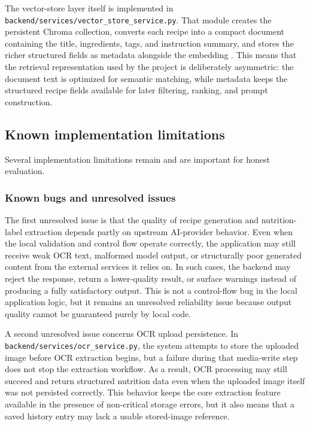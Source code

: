 The vector-store layer itself is implemented in
\texttt{backend/services/vector\_store\_service.py}. That module creates
the persistent Chroma collection, converts each recipe into a compact
document containing the title, ingredients, tags, and instruction
summary, and stores the richer structured fields as metadata alongside
the embedding \cite{chromadb2026docs}. This means that the retrieval
representation used by the project is deliberately asymmetric: the
document text is optimized for semantic matching, while metadata keeps
the structured recipe fields available for later filtering, ranking, and
prompt construction.

\subsection{Known implementation limitations}

Several implementation limitations remain and are important for honest
evaluation.

\subsubsection{Known bugs and unresolved issues}

The first unresolved issue is that the quality of recipe generation and
nutrition-label extraction depends partly on upstream AI-provider
behavior. Even when the local validation and control flow operate
correctly, the application may still receive weak OCR text, malformed
model output, or structurally poor generated content from the external
services it relies on. In such cases, the backend may reject the
response, return a lower-quality result, or surface warnings instead of
producing a fully satisfactory output. This is not a control-flow bug in
the local application logic, but it remains an unresolved reliability
issue because output quality cannot be guaranteed purely by local code.

A second unresolved issue concerns OCR upload persistence. In
\texttt{backend/services/ocr\_service.py}, the system attempts to store
the uploaded image before OCR extraction begins, but a failure during
that media-write step does not stop the extraction workflow. As a
result, OCR processing may still succeed and return structured nutrition
data even when the uploaded image itself was not persisted correctly.
This behavior keeps the core extraction feature available in the
presence of non-critical storage errors, but it also means that a saved
history entry may lack a usable stored-image reference.


